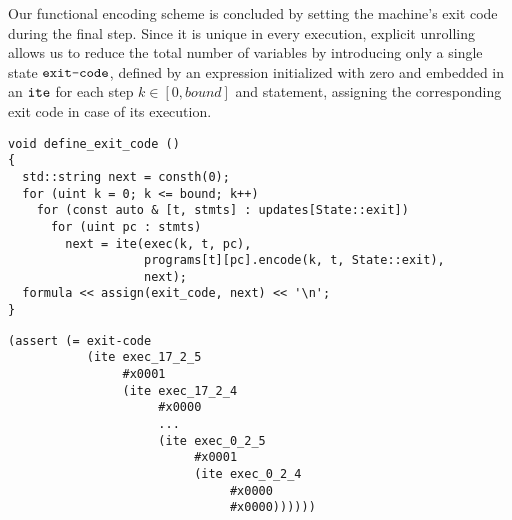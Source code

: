 \noindent
Our functional encoding scheme is concluded by setting the machine's exit code during the final step.
Since it is unique in every execution, explicit unrolling allows us to reduce the total number of variables by introducing only a single state $\texttt{exit-code}$, %
defined by an expression initialized with zero and embedded in an $\texttt{ite}$
for each step $k \in [0, bound]$ and  statement, assigning the corresponding exit code in case of its execution.

\begin{lstlisting}[style=c++]
void define_exit_code ()
{
  std::string next = consth(0);
  for (uint k = 0; k <= bound; k++)
    for (const auto & [t, stmts] : updates[State::exit])
      for (uint pc : stmts)
        next = ite(exec(k, t, pc),
                   programs[t][pc].encode(k, t, State::exit),
                   next);
  formula << assign(exit_code, next) << '\n';
}
\end{lstlisting}

\begin{lstlisting}[style=smtlib]
(assert (= exit-code
           (ite exec_17_2_5
                #x0001
                (ite exec_17_2_4
                     #x0000
                     ...
                     (ite exec_0_2_5
                          #x0001
                          (ite exec_0_2_4
                               #x0000
                               #x0000))))))
\end{lstlisting}

